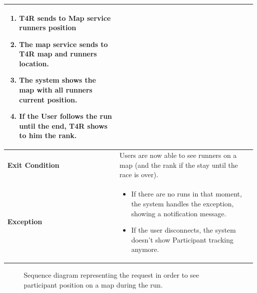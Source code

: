 \begin{table}[H]
\begin{tabular}{|p{3cm}|p{8.2cm}|}
\begin{enumerate}
                        \item T4R sends to Map service runners position
                                                \item The map service sends to T4R map and runners location.
                                                \item The system shows the map with all runners current position.
                                                \item If the User follows the run until the end, T4R shows to him the rank.
                                            \end{enumerate} \\
                     \hline
                    \textbf{Exit Condition} & Users are now able to see runners on a map (and the rank if the stay until the race is over). \\
                     \hline
                    \textbf{Exception} & 
                    \begin{itemize}
                        \item If there are no runs in that moment, the system handles the exception, showing a notification message.
                        \item If the user disconnects, the system doesn't show Participant tracking anymore.
                    \end{itemize} \\
                     \hline
                \end{tabular}  
            \end{table}
            
            \begin{figure}[H]
                \centering
                \caption{Sequence diagram representing the request in order to see participant position on a map during the run.}
                \label{fig:T4R-runner-tracking}
            \end{figure}
            
